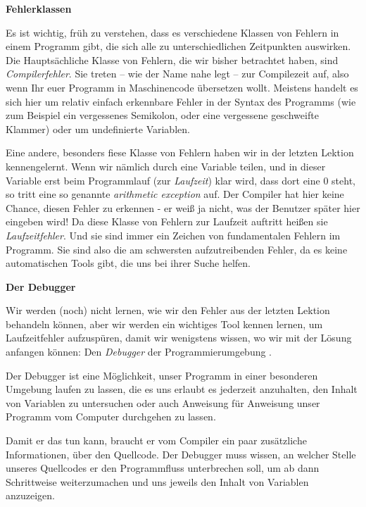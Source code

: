 
\textbf{Fehlerklassen}

Es ist wichtig, früh zu verstehen, dass es verschiedene Klassen von Fehlern in
einem \Java Programm gibt, die sich alle zu unterschiedlichen Zeitpunkten
auswirken. Die Hauptsächliche Klasse von Fehlern, die wir bisher betrachtet
haben, sind \emph{Compilerfehler}. Sie treten -- wie der Name nahe legt -- zur
Compilezeit auf, also wenn Ihr euer Programm in Maschinencode übersetzen wollt.
Meistens handelt es sich hier um relativ einfach erkennbare Fehler in der Syntax
des Programms (wie zum Beispiel ein vergessenes Semikolon, oder eine vergessene
geschweifte Klammer) oder um undefinierte Variablen.

Eine andere, besonders fiese Klasse von Fehlern haben wir in der letzten Lektion
kennengelernt. Wenn wir nämlich durch eine Variable teilen, und in dieser
Variable erst beim Programmlauf (zur \emph{Laufzeit}) klar wird, dass dort eine
0 steht, so tritt eine so genannte \emph{arithmetic exception} auf. Der Compiler
hat hier keine Chance, diesen Fehler zu erkennen - er weiß ja nicht, was der
Benutzer später hier eingeben wird! Da diese Klasse von Fehlern zur Laufzeit
auftritt heißen sie \emph{Laufzeitfehler}. Und sie sind immer ein Zeichen von
fundamentalen Fehlern im Programm. Sie sind also die am schwersten
aufzutreibenden Fehler, da es keine automatischen Tools gibt, die uns bei ihrer
Suche helfen.

\textbf{Der Debugger}

Wir werden (noch) nicht lernen, wie wir den Fehler aus der letzten Lektion
behandeln können, aber wir werden ein wichtiges Tool kennen lernen, um
Laufzeitfehler aufzuspüren, damit wir wenigstens wissen, wo wir mit der Lösung
anfangen können: Den \emph{Debugger} der Programmierumgebung \Eclipse.

Der Debugger ist eine Möglichkeit, unser Programm in einer besonderen Umgebung
laufen zu lassen, die es uns erlaubt es jederzeit anzuhalten, den Inhalt von
Variablen zu untersuchen oder auch Anweisung für Anweisung unser Programm vom
Computer durchgehen zu lassen.

Damit er das tun kann, braucht er vom Compiler ein paar zusätzliche
Informationen, über den Quellcode. Der Debugger muss wissen, an welcher Stelle
unseres Quellcodes er den Programmfluss unterbrechen soll, um ab dann
Schrittweise weiterzumachen und uns jeweils den Inhalt von Variablen anzuzeigen.


